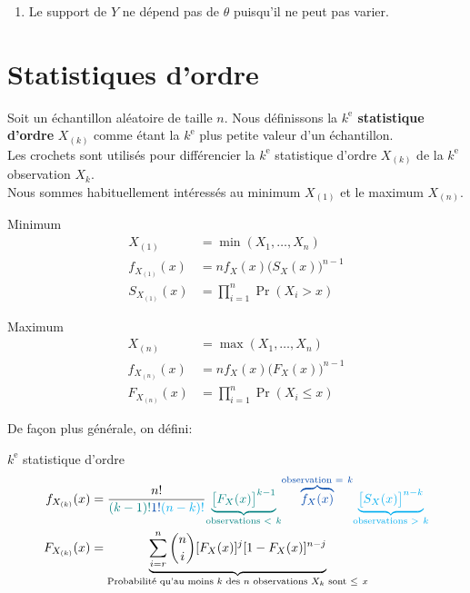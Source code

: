 \documentclass[10pt, french]{article}
\begin{document}
\begin{multicols*}{2}
\begin{enumerate}
	\item 	Le support de $Y$ ne dépend pas de $\theta$ puisqu'il ne peut pas varier.
\end{enumerate}

\columnbreak
\section{Statistiques d'ordre}

Soit un échantillon aléatoire de taille $n$.
Nous définissons la \textbf{$k^{\text{e}}$ statistique d'ordre} $X_{(k)}$ comme étant la $k^{\text{e}}$ plus petite valeur d'un échantillon.\\
Les crochets sont utilisés pour différencier la $k^{\text{e}}$ statistique d'ordre $X_{(k)}$ de la $k^{\text{e}}$ observation $X_{k}$.\\

Nous sommes habituellement intéressés au minimum $X_{(1)}$ et le maximum $X_{(n)}$.

\setlength{\mathindent}{-0.75cm}
\begin{minipage}{0.5\columnwidth}
\begin{algo}{Minimum}
\begin{align*}
	X_{(1)}
	&=	\min(X_{1}, \dots, X_{n})	\\
	f_{X_{(1)}}(x)
	&=	n f_{X}(x) \big( S_{X}(x) \big)^{n - 1}	\\
	S_{X_{(1)}}(x)
	&=	\prod_{i = 1}^{n} \Pr(X_{i} > x)
\end{align*}
\end{algo}
\end{minipage}
\begin{minipage}{0.5\columnwidth}
\begin{algo}{Maximum}
\begin{align*}
	X_{(n)}
	&=	\max(X_{1}, \dots, X_{n})	\\
	f_{X_{(n)}}(x)
	&=	n f_{X}(x) \big( F_{X}(x) \big)^{n - 1}	\\
	F_{X_{(n)}}(x)
	&=	\prod_{i = 1}^{n} \Pr(X_{i} \le x)
\end{align*}
\end{algo}
\end{minipage}
\setlength{\mathindent}{1cm}

De façon plus générale, on défini:
\begin{algo}{$k^{\text{e}}$ statistique d'ordre}
\begin{align*}
	f_{X_{(k)}}(x)
	&=	\frac{n!}{\textcolor{teal}{(k - 1)!} \textcolor{cobalt}{1!} \textcolor{cyan}{(n - k)!}} \textcolor{teal}{\underset{\text{observations } < \ k}{\underbrace{\big[ F_{X}(x) \big]^{k - 1}}}} \textcolor{cobalt}{\overset{\text{observation } = \ k}{\overbrace{f_{X}(x)}}} \textcolor{cyan}{\underset{\text{observations } > \ k}{\underbrace{\big[ S_{X}(x) \big]^{n - k}}}} \\
	F_{X_{(k)}}(x)
	&=	\underset{\text{Probabilité qu'au moins } k \text{ des } n \text{ observations } X_{k} \text{ sont } \le \ x}{\underbrace{\sum_{i = r}^{n} \binom{n}{i} [F_{X}(x)]^{j} [1 - F_{X}(x)]^{n - j}}}
\end{align*}
\end{algo}


\end{multicols*}
\end{document}
